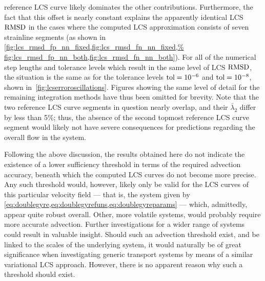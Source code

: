 reference LCS curve likely dominates the other contributions. Furthermore, the
fact that this offset is nearly constant explains the apparently identical LCS
$\operatorname{RMSD}$ in the cases where the computed LCS approximation consists of seven
strainline segments (as shown in
\cref{fig:lcs_rmsd_fp_nn_fixed,fig:lcs_rmsd_fn_nn_fixed,%
fig:lcs_rmsd_fp_nn_both,fig:lcs_rmsd_fn_nn_both}). For all of the numerical step
lengths and tolerance levels which result in the same level of LCS $\operatorname{RMSD}$, the
situation is the same as for the  tolerance levels $\textnormal{tol}=10^{-6}$
and $\textnormal{tol}=10^{-8}$, shown in~\cref{fig:lcserroroscillations}. Figures
showing the same level of  detail for the remaining integration methods have
thus been omitted for brevity. Note that the two reference LCS curve
segments in question nearly overlap, and their $\overline{\lambda}_{2}$ differ
by less than 5\%; thus, the absence of the second topmost reference LCS curve
segment would likely not have severe consequences for predictions regarding
the overall flow in the system.



Following the above discussion, the results obtained here do not indicate
the existence of a lower sufficiency threshold in terms of the required
advection accuracy, beneath which the computed LCS curves do not become more
precise. Any such threshold would, however, likely only be valid for the LCS
curves of this particular velocity field --- that is, the system given by
\cref{eq:doublegyre,eq:doublegyrefuns,eq:doublegyreparams} --- which,
admittedly, appear quite robust overall. Other, more volatile systems, would
probably require more accurate advection. Further investigations
for a wider range of systems could result in valuable insight. Should such an
advection threshold exist, and be linked to the scales of the underlying system,
it would naturally be of great significance when investigating generic transport
systems by means of a similar variational LCS approach. However, there is
no apparent reason why such a threshold should exist.

